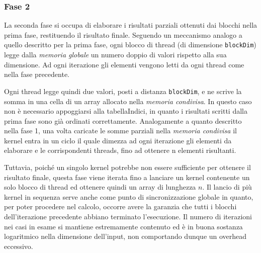 \documentclass[a4paper]{article}   %
\begin{document}
\subsubsection{Fase 2}
La seconda fase si occupa di elaborare i risultati parziali ottenuti dai blocchi nella prima fase, restituendo il risultato finale. 
Seguendo un meccanismo analogo a quello descritto per la prima fase, ogni blocco di thread (di dimensione {\tt blockDim}) legge dalla \emph{memoria globale} un numero doppio di valori rispetto alla sua dimensione. 
Ad ogni iterazione gli elementi vengono letti da ogni thread come nella fase precedente. 

Ogni thread legge quindi due valori, posti a distanza {\tt blockDim}, e ne scrive la somma in una cella di un array allocato nella \emph{memoria condivisa}. In questo caso non è necessario appoggiarsi alla tabellaIndici, in quanto i risultati scritti dalla prima fase sono già ordinati correttamente.
Analogamente a quanto descritto nella fase 1, una volta caricate le somme parziali nella \emph{memoria condivisa} il kernel entra in un ciclo il quale dimezza ad ogni iterazione gli elementi da elaborare e le corrispondenti threads, fino ad ottenere n elementi risultanti. 

Tuttavia, poiché un singolo kernel potrebbe non essere sufficiente per ottenere il risultato finale, questa fase viene iterata fino a lanciare un kernel contenente un solo blocco di thread ed ottenere quindi un array di lunghezza $n$. Il lancio di più kernel in sequenza serve anche come punto di sincronizzazione globale in quanto, per poter procedere nel calcolo, occorre avere la garanzia che tutti i blocchi dell’iterazione precedente abbiano terminato l’esecuzione. Il numero di iterazioni nei casi in esame si mantiene estremamente contenuto ed è in buona sostanza logaritmico nella dimensione dell’input, non comportando dunque un overhead eccessivo. 

\end{document}
